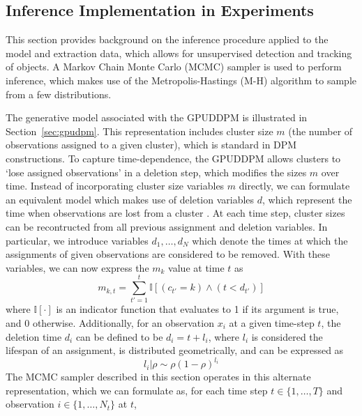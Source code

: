 \documentclass[smallcondensed, final]{svjour3}
\begin{document}
\subsection{Inference Implementation in Experiments}
\label{sec:inference_spec}

This section provides background on the inference procedure applied to the model and extraction data, which allows for unsupervised detection and tracking of objects. A Markov Chain Monte Carlo (MCMC) sampler is used to perform inference, which makes use of the Metropolis-Hastings (M-H) algorithm to sample from a few distributions.

The generative model associated with the GPUDDPM is illustrated in Section~\ref{sec:gpudpm}. This representation includes cluster size $m$ (the number of observations assigned to a given cluster), which is standard in DPM constructions. To capture time-dependence, the GPUDDPM allows clusters to `lose assigned observations' in a deletion step, which modifies the sizes $m$ over time. Instead of incorporating cluster size variables $m$ directly, we can formulate an equivalent model which makes use of deletion variables $d$, which represent the time when observations are lost from a cluster . At each time step, cluster sizes can be recontructed from all previous assignment and deletion variables. In particular, we introduce variables $d_{1}, \ldots, d_{N}$ which denote the times at which the assignments of given observations are considered to be removed. With these variables, we can now express the $m_{k}$ value at time $t$ as
\begin{equation}
\label{compute_clust_size}
m_{k,t} = \sum_{t' = 1}^{t} \mathbb{I}[(c_{t'}=k) \wedge (t < d_{t'})]
\end{equation}
where $\mathbb{I}[\cdot]$ is an indicator function that evaluates to 1 if its argument is true, and 0 otherwise. Additionally, for an observation $x_{i}$ at a given time-step $t$, the deletion time $d_{i}$ can be defined to be $d_{i} = t + l_{i}$, where $l_{i}$ is considered the lifespan of an assignment, is distributed geometrically, and can be expressed as
\begin{equation}
\label{del_rho_form}
l_{i} | \rho  \sim  \rho(1 - \rho)^{l_{i}}
\end{equation}
The MCMC sampler described in this section operates in this alternate representation, which we can formulate as, for each time step $t \in \{1, \ldots, T\}$ and observation $i \in \{ 1, \ldots, N_{t} \}$ at $t$,
\end{document}
